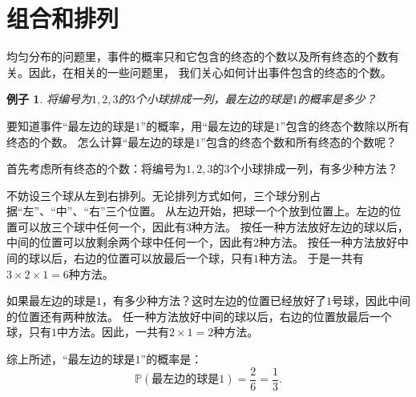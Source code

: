 \documentclass[12pt,UTF8]{ctexbook}
\newtheorem{ex}{例子}[section]
\begin{document}


\section{组合和排列}
均匀分布的问题里，事件的概率只和它包含的终态的个数以及所有终态的个数有关。因此，在相关的一些问题里，
我们关心如何计出事件包含的终态的个数。

\begin{ex}
    将编号为$1,2,3$的$3$个小球排成一列，最左边的球是$1$的概率是多少？
\end{ex}
要知道事件“最左边的球是$1$”的概率，用“最左边的球是$1$”包含的终态个数除以所有终态的个数。
怎么计算“最左边的球是$1$”包含的终态个数和所有终态的个数呢？

首先考虑所有终态的个数：将编号为$1,2,3$的$3$个小球排成一列，有多少种方法？

不妨设三个球从左到右排列。无论排列方式如何，三个球分别占据“左”、“中”、“右”三个位置。
从左边开始，把球一个个放到位置上。左边的位置可以放三个球中任何一个，因此有$3$种方法。
按任一种方法放好左边的球以后，中间的位置可以放剩余两个球中任何一个，因此有$2$种方法。
按任一种方法放好中间的球以后，右边的位置可以放最后一个球，只有$1$种方法。
于是一共有$3\times 2\times 1 = 6$种方法。

如果最左边的球是$1$，有多少种方法？这时左边的位置已经放好了$1$号球，因此中间的位置还有两种放法。
任一种方法放好中间的球以后，右边的位置放最后一个球，只有$1$中方法。因此，一共有$2\times 1 = 2$种方法。

综上所述，“最左边的球是$1$”的概率是：
$$ \mathbb{P}(\mbox{最左边的球是}1) = \frac{2}{6} = \frac{1}{3}. $$
\end{document}
